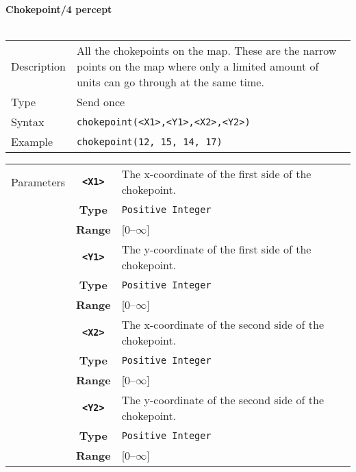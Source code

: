 \noindent
\textbf{Chokepoint/4 percept}\\
\\
\begin{tabularx}{\textwidth}{lX}
 Description & All the chokepoints on the map. These are the narrow points on the map where only a limited amount of units can go through at the same time.  \\
 Type & Send once \\
 Syntax & \verb|chokepoint(<X1>,<Y1>,<X2>,<Y2>)| \\
 Example & \verb|chokepoint(12, 15, 14, 17)| \\
 \end{tabularx}
 \begin{tabularx}{\textwidth}{l | c | p{8cm}|}
 \cline{2-3}
 Parameters & \textbf{\verb|<X1>|} & The x-coordinate of the first side of the chokepoint.\\
            & \textbf{Type} & \verb|Positive Integer| \\
            & \textbf{Range} & [0--$\infty$] \\
            \cline{2-3}
            & \textbf{\verb|<Y1>|} & The y-coordinate of the first side of the chokepoint.\\
            & \textbf{Type} & \verb|Positive Integer| \\
            & \textbf{Range} & [0--$\infty$] \\
            \cline{2-3}
            & \textbf{\verb|<X2>|} & The x-coordinate of the second side of the chokepoint.\\
            & \textbf{Type} & \verb|Positive Integer| \\
            & \textbf{Range} & [0--$\infty$] \\
            \cline{2-3}
            & \textbf{\verb|<Y2>|} & The y-coordinate of the second side of the chokepoint.\\
            & \textbf{Type} & \verb|Positive Integer| \\
            & \textbf{Range} & [0--$\infty$] \\
            \cline{2-3}
\end{tabularx}\\

